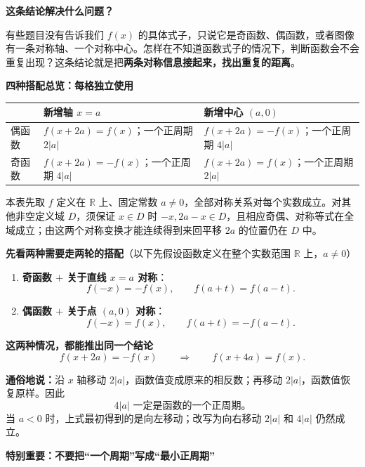 \begin{statementbox}


\textbf{\textcolor{CStatement}{这条结论解决什么问题？}}

有些题目没有告诉我们 $f(x)$ 的具体式子，只说它是奇函数、偶函数，或者图像有一条对称轴、一个对称中心。怎样在不知道函数式子的情况下，判断函数会不会重复出现？这条结论就是把\textbf{两条对称信息接起来，找出重复的距离}。

\medskip
\end{statementbox}\clearpage\begin{statementbox}\textbf{\textcolor{CStatement}{四种搭配总览：每格独立使用}}
\begin{center}
\renewcommand{\arraystretch}{1.5}
\begin{tabular}{p{.17\linewidth}|p{.34\linewidth}|p{.34\linewidth}}
 & 新增轴 $x=a$ & 新增中心 $(a,0)$\\\hline
偶函数 & $f(x+2a)=f(x)$；一个正周期 $2|a|$ & $f(x+2a)=-f(x)$；一个正周期 $4|a|$\\\hline
奇函数 & $f(x+2a)=-f(x)$；一个正周期 $4|a|$ & $f(x+2a)=f(x)$；一个正周期 $2|a|$
\end{tabular}
\end{center}
本表先取 $f$ 定义在 $\mathbb R$ 上、固定常数 $a\ne0$，全部对称关系对每个实数成立。对其他非空定义域 $D$，须保证 $x\in D$ 时 $-x,2a-x\in D$，且相应奇偶、对称等式在全域成立；由这两个对称变换才能连续得到来回平移 $2a$ 的位置仍在 $D$ 中。

\medskip
\textbf{\textcolor{CStatement}{先看两种需要走两轮的搭配}}（以下先假设函数定义在整个实数范围 $\mathbb{R}$ 上，$a\ne0$）
\begin{enumerate}[leftmargin=*,itemsep=0.3em]
  \item \textbf{奇函数 $+$ 关于直线 $x=a$ 对称}：
  \[f(-x)=-f(x),\qquad f(a+t)=f(a-t).\]
  \item \textbf{偶函数 $+$ 关于点 $(a,0)$ 对称}：
  \[f(-x)=f(x),\qquad f(a+t)=-f(a-t).\]
\end{enumerate}

\textbf{\textcolor{CStatement}{这两种情况，都能推出同一个结论}}
\[
\boxed{f(x+2a)=-f(x)}
\qquad\Longrightarrow\qquad
\boxed{f(x+4a)=f(x)}.
\]

\textbf{通俗地说：}沿 $x$ 轴移动 $2|a|$，函数值变成原来的相反数；再移动 $2|a|$，函数值恢复原样。因此
\[
\boxed{4|a|\text{ 一定是函数的一个正周期。}}
\]
当 $a<0$ 时，上式最初得到的是向左移动；改写为向右移动 $2|a|$ 和 $4|a|$ 仍然成立。

\medskip
\end{statementbox}\clearpage\begin{statementbox}\textbf{\textcolor{CStatement}{特别重要：不要把“一个周期”写成“最小正周期”}}


\end{statementbox}
